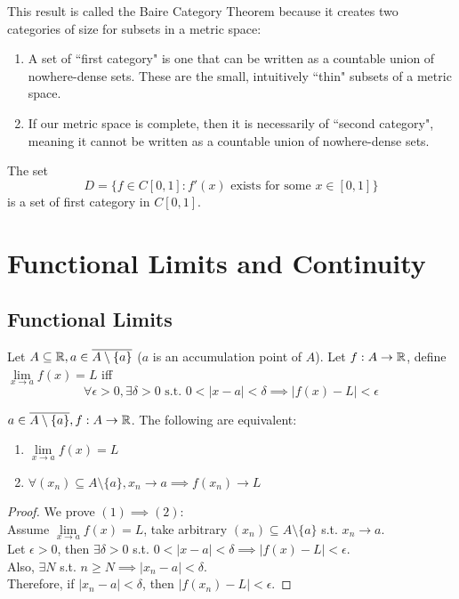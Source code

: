 \documentclass[11pt]{article}
\begin{document}
\remark
This result is called the Baire Category Theorem because it creates two categories of size for subsets in a metric space:
\begin{enumerate}
	\item A set of ``first category" is one that can be written as a countable union of nowhere-dense sets. These are the small, intuitively ``thin" subsets of a metric space.
	\item If our metric space is complete, then it is necessarily of ``second category", meaning it cannot be written as a countable union of nowhere-dense sets.
\end{enumerate}

\theorem
The set
$$D = \{f \in C[0,1]: f'(x) \text{ exists for some } x \in [0, 1]\}$$ is a set of first category in $C[0,1]$.



\section{Functional Limits and Continuity}
\subsection{Functional Limits}
 Let $A \subseteq \mathbb{R}, a \in \overline{A \setminus \{a\}}$ ($a$ is an accumulation point of $A$). Let $f: A \rightarrow \mathbb{R}$, define $\underset{x \rightarrow a}{\lim} f(x) = L$ iff
$$\forall \epsilon > 0, \exists \delta > 0 \text{ s.t. } 0 < |x - a| < \delta \implies |f(x) - L| < \epsilon$$

$a \in \overline{A \setminus \{a\}}, f:A \rightarrow \mathbb{R}$. The following are equivalent:
\begin{enumerate}
	\item $\underset{x \rightarrow a}{\lim} f(x) = L$
	\item $\forall (x_n) \subseteq A \setminus \{a\}, x_n \rightarrow a \implies f(x_n) \rightarrow L$
\end{enumerate}
\begin{proof}
	We prove $(1) \implies (2)$: \\
	Assume $\underset{x \rightarrow a}{\lim} f(x) = L$, take arbitrary $(x_n) \subseteq A \setminus \{a\}$ s.t. $x_n \rightarrow a$. \\
	Let $\epsilon > 0$, then $\exists \delta > 0$ s.t. $0 < |x - a| < \delta \implies |f(x) - L| < \epsilon$. \\
	Also, $\exists N$ s.t. $n \geq N \implies |x_n - a| < \delta$. \\
	Therefore, if $|x_n - a| < \delta$, then $|f(x_n) - L| < \epsilon$. 
\end{proof}
\end{document}
